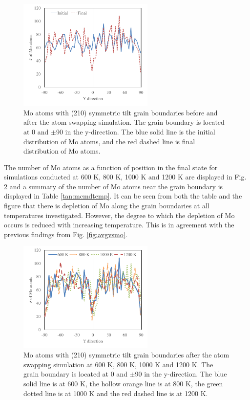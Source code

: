 \documentclass[review]{elsarticle}
\begin{document}
\begin{figure}[h]
 \centering
 \includegraphics[width=0.6\textwidth]{600mcmdA.png} 
 \caption{Mo atoms with (210) symmetric tilt grain boundaries before and after the atom swapping simulation. The grain boundary is located at 0 and $\pm$90 in the y-direction. The blue solid line is the initial distribution of Mo atoms, and the red dashed line is final distribution of Mo atoms.}
 \label{fig:600mcmdA}
\end{figure}

\FloatBarrier

The number of Mo atoms as a function of position in the final state for simulations conducted at 600 K, 800 K, 1000 K and 1200 K are displayed in Fig. \ref{fig:mcmdtemp} and a summary of the number of Mo atoms near the grain boundary is displayed in Table \ref{tan:mcmdtemp}. It can be seen from both the table and the figure that there is depletion of Mo along the grain boundaries at all temperatures investigated. However, the degree to which the depletion of Mo occurs is reduced with increasing temperature. This is in agreement with the previous findings from Fig. \ref{fig:avgvsmo}. 
 
\begin{figure}[h]
 \centering
 \includegraphics[width=0.6\textwidth]{mcmdtemp.png} 
 \caption{Mo atoms with  (210) symmetric tilt grain boundaries after the atom swapping simulation at 600 K, 800 K, 1000 K and 1200 K. The grain boundary is located at 0 and $\pm$90 in the y-direction. The blue solid line is at 600 K, the hollow orange line is at 800 K, the green dotted line is at 1000 K and the red dashed line is at 1200 K.}
 \label{fig:mcmdtemp}
\end{figure}
\end{document}

